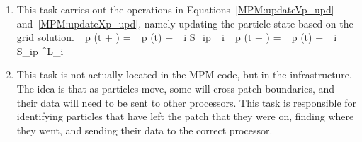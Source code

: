 \begin{enumerate}
\item {}  This task carries out the
operations in Equations~\ref{MPM:updateVp_upd} and~\ref{MPM:updateXp_upd}, namely updating
the particle state based on the grid solution.
\Beq
  \bfv_p (t + )  = \bfv_p (t)  + \sum_{i} S_{ip} \bfa_i   
  \label{MPM:updateVp_upd}
\Eeq
\Beq
  \bfx_p (t + )  = \bfx_p (t)  + \sum_{i} S_{ip} \bfv^L_i  
  \label{MPM:updateXp_upd}
\Eeq

\item {}  This task is not actually located
in the MPM code, but in the \Vaango infrastructure.  The idea is that as particles
move, some will cross patch boundaries, and their data will need to be sent to
other processors.  This task is responsible for identifying particles that have
left the patch that they were on, finding where they went, and sending their
data to the correct processor.

\end{enumerate}
